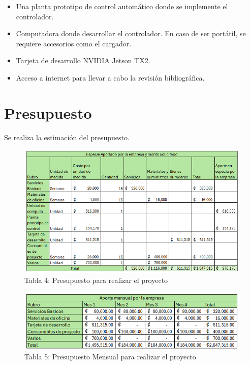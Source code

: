 \documentclass[12pt]{article}
\begin{document}
\begin{itemize}
  \item Una planta prototipo de control automático donde se implemente el controlador.
  \item Computadora donde desarrollar el controlador. En caso de ser portátil, se requiere accesorios como el cargador.
  \item Tarjeta de desarrollo NVIDIA Jetson TX2.
  \item Acceso a internet para llevar a cabo la revisión bibliográfica.
\end{itemize}

\newpage

\section{Presupuesto}

Se realiza la estimación del presupuesto. 

\begin{figure}[ht]
  \centering
  \includegraphics[scale=0.8]{tablas/ptot.png}
  \captionsetup{labelformat=empty}  %
  \caption{Tabla 4: Presupuesto para realizar el proyecto}
\end{figure}

\begin{figure}[ht]
  \centering
  \includegraphics[scale=0.8]{tablas/pmensual.png}
  \captionsetup{labelformat=empty}  %
  \caption{Tabla 5: Presupuesto Mensual para realizar el proyecto}
\end{figure}


\newpage



\end{document}
